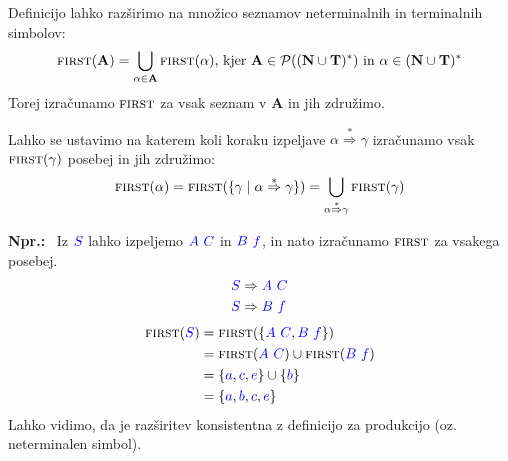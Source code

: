 \documentclass{article}
\newcommand{\Ex}{\textbf{Npr.:}\ }
\newcommand{\FIRST}{\textsc{first}}
\newcommand{\Set}[1]{\mathbf{#1}}
\newcommand{\Symbol}[1]{\textcolor{blue}{#1}}
\newcommand{\Terminals}{\Set{T}}
\newcommand{\NonTerminals}{\Set{N}}
\newcommand{\Powerset}[1]{\mathcal{P}(#1)}
\newcommand{\Derive}{\Rightarrow}
\newcommand{\DeriveStar}{\overset{\ast}{\Rightarrow}}
\newcommand{\Seq}{\ }
\newcommand{\Kleene}[1]{#1^\ast}
\begin{document}
Definicijo lahko razširimo na množico seznamov neterminalnih in terminalnih simbolov:
\begin{equation*}
  \FIRST(\Set{A}) = \bigcup_{\alpha \in \Set{A}} \FIRST(\alpha) \text{, kjer } \Set{A} \in \Powerset{\Kleene{(\NonTerminals \cup \Terminals)}} \text{ in } \alpha \in \Kleene{(\NonTerminals \cup \Terminals)}
\end{equation*}
Torej izračunamo $\FIRST$ za vsak seznam v $\Set{A}$ in jih združimo.

Lahko se ustavimo na katerem koli koraku izpeljave $\alpha \DeriveStar \gamma$ izračunamo vsak $\FIRST(\gamma)$ posebej in jih združimo:
\begin{equation*}
  \FIRST(\alpha) = \FIRST(\{\gamma \mid \alpha \DeriveStar \gamma\}) = \bigcup_{\alpha \DeriveStar \gamma} \FIRST(\gamma)
\end{equation*}

\Ex
  Iz $\Symbol{S}$ lahko izpeljemo $\Symbol{A} \Seq \Symbol{C}$ in $\Symbol{B} \Seq \Symbol{f}$, in nato izračunamo $\FIRST$ za vsakega posebej.
  \begin{align*}
    \Symbol{S} &\Derive \Symbol{A} \Seq \Symbol{C}\\
    \Symbol{S} &\Derive \Symbol{B} \Seq \Symbol{f}
  \end{align*}
  \begin{align*}
    \FIRST(\Symbol{S}) &= \FIRST(\{\Symbol{A} \Seq \Symbol{C}, \Symbol{B} \Seq \Symbol{f}\}) \\
              &= \FIRST(\Symbol{A} \Seq \Symbol{C}) \cup \FIRST(\Symbol{B} \Seq \Symbol{f})\\
              &= \{\Symbol{a}, \Symbol{c}, \Symbol{e}\} \cup \{\Symbol{b}\} \\
              &= \{\Symbol{a}, \Symbol{b}, \Symbol{c}, \Symbol{e}\}
  \end{align*}
  Lahko vidimo, da je razširitev konsistentna z definicijo za produkcijo (oz. neterminalen simbol).
\end{document}

